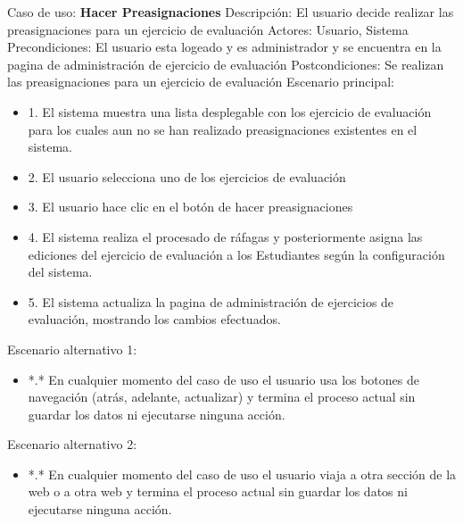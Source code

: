 Caso de uso: \textbf{Hacer Preasignaciones}
\newline
Descripción: El usuario decide realizar las preasignaciones para un ejercicio de evaluación
\newline
Actores: Usuario, Sistema
\newline
Precondiciones: El usuario esta logeado y es administrador y se encuentra en la pagina de administración de ejercicio de evaluación
\newline
Postcondiciones: Se realizan las preasignaciones para un ejercicio de evaluación
\newline
Escenario principal:
\begin{itemize}
	\item 1. El sistema muestra una lista desplegable con los ejercicio de evaluación para los cuales aun no se han realizado preasignaciones existentes en el sistema.
	\item 2. El usuario selecciona uno de los ejercicios de evaluación
	\item 3. El usuario hace clic en el botón de hacer preasignaciones
	\item 4. El sistema realiza el procesado de ráfagas y posteriormente asigna las ediciones del ejercicio de evaluación a los Estudiantes según la configuración del sistema.
	\item 5. El sistema actualiza la pagina de administración de ejercicios de evaluación, mostrando los cambios efectuados.
\end{itemize}
Escenario alternativo 1: 
\begin{itemize}
	\item *.* En cualquier momento del caso de uso el usuario usa los botones de navegación (atrás, adelante, actualizar) y termina el proceso actual sin guardar los datos ni ejecutarse ninguna acción.
\end{itemize}
Escenario alternativo 2:
\begin{itemize}
	\item *.* En cualquier momento del caso de uso el usuario viaja a otra sección de la web o a otra web y termina el proceso actual sin guardar los datos ni ejecutarse ninguna acción.
\end{itemize}

